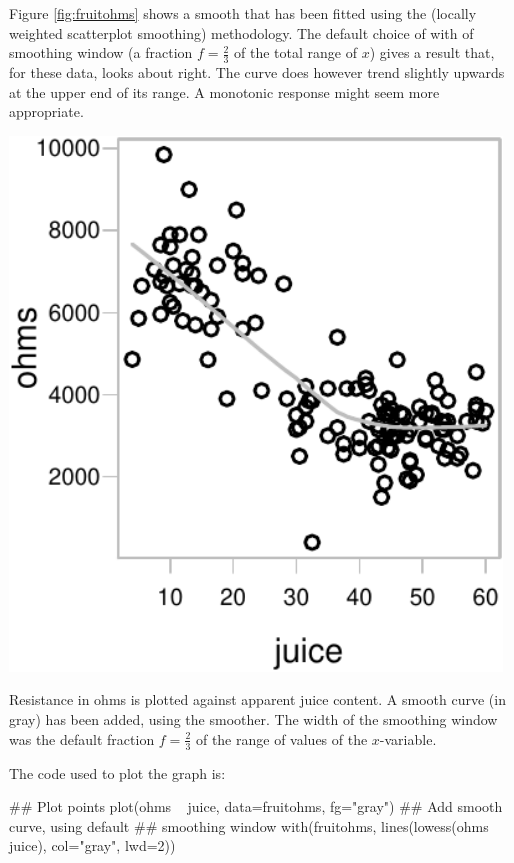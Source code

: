 Figure \ref{fig:fruitohms} shows a smooth that has been fitted using
the  (locally weighted scatterplot smoothing)
methodology.  The default choice of with of smoothing window (a fraction
$f = \frac{2}{3}$ of the total range of $x$) gives a result that,
for these data, looks about right. The curve does however trend
slightly upwards at the upper end of its range.  A monotonic
response might seem more appropriate.

\begin{marginfigure}
\begin{Schunk}


\centerline{\includegraphics[width=0.98\textwidth]{figs/8-smooth-ohms-1} }

\end{Schunk}
  \caption{Resistance in ohms is plotted against apparent juice
    content.  A smooth curve (in gray) has been added, using the
     smoother.  The width of the smoothing window was the
    default fraction $f = \frac{2}{3}$ of the range of values of the
    $x$-variable.}\label{fig:fruitohms}
\end{marginfigure}

The code used to plot the graph is:
\begin{Schunk}
\begin{Sinput}
## Plot points
plot(ohms ~ juice, data=fruitohms, fg="gray")
## Add smooth curve, using default
## smoothing window
with(fruitohms,
     lines(lowess(ohms ~ juice), col="gray", lwd=2))
\end{Sinput}
\end{Schunk}

